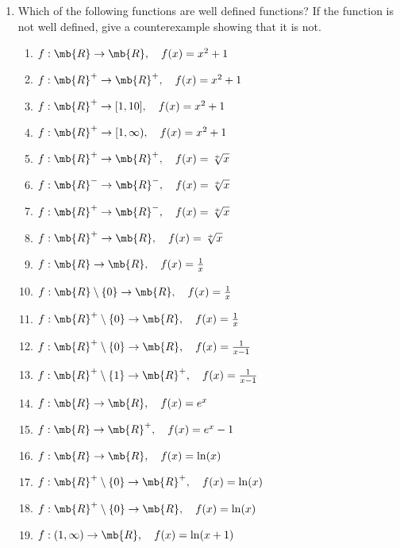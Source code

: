 \begin{enumerate}
\item Which of the following functions are well defined functions? If the function is not well defined, give a counterexample showing that it is not.
  \begin{multicols}{2}
    \begin{enumerate}
    \item $f: \mb{R} \to \mb{R},\quad f(x)=x^2+1$
    \item $f: \mb{R}^+ \to \mb{R}^+,\quad f(x)=x^2+1$
    \item $f: \mb{R}^+ \to [1,10],\quad f(x)=x^2+1$
    \item $f: \mb{R}^+ \to [1,\infty),\quad f(x)=x^2+1$
    \item $f: \mb{R}^+ \to \mb{R}^+,\quad f(x)=\sqrt[+]{x}$
    \item $f: \mb{R}^- \to \mb{R}^-,\quad f(x)=\sqrt[+]{x}$
    \item $f: \mb{R}^+ \to \mb{R}^-,\quad f(x)=\sqrt[+]{x}$
    \item $f: \mb{R}^+ \to \mb{R},\quad f(x)=\sqrt[+]{x}$
    \item $f: \mb{R} \to \mb{R},\quad f(x)=\frac{1}{x}$
    \item $f: \mb{R}\setminus\{0\} \to \mb{R},\quad f(x)=\frac{1}{x}$
    \item $f: \mb{R}^+\setminus\{0\} \to \mb{R},\quad f(x)=\frac{1}{x}$
    \item $f: \mb{R}^+\setminus\{0\} \to \mb{R},\quad f(x)=\frac{1}{x-1}$
    \item $f: \mb{R}^+\setminus\{1\} \to \mb{R}^+,\quad f(x)=\frac{1}{x-1}$
    \item $f: \mb{R} \to \mb{R},\quad f(x)=e^x$
    \item $f: \mb{R} \to \mb{R}^+,\quad f(x)=e^x-1$
    \item $f: \mb{R} \to \mb{R},\quad f(x)=\ln(x)$
    \item $f: \mb{R}^+\setminus \{0\} \to \mb{R}^+,\quad f(x)=\ln(x)$
    \item $f: \mb{R}^+\setminus \{0\} \to \mb{R},\quad f(x)=\ln(x)$
    \item $f: (1,\infty) \to \mb{R},\quad f(x)=\ln(x+1)$
    \end{enumerate}
  \end{multicols}


\end{enumerate}
